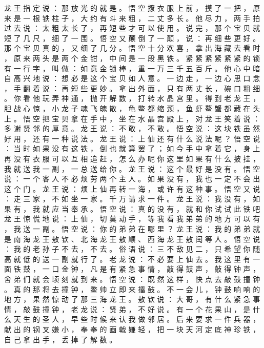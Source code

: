 {龙 王 指 定 说 ： 那 放 光 的 就 是 。
悟 空 撩 衣 服 上 前 ， 摸 了 一 把 ， 原 来 是 一 根 铁 柱 子 ， 大 约 有 斗 来 粗 ， 二 丈 多 长 。
他 尽 力 ， 两 手 拍 过 去 说 ： 太 粗 太 长 了 ， 再 短 些 才 可 以 使 用 。
说 完 ， 那 个 宝 贝 就 短 了 几 尺 ， 细 了 一 围 。
悟 空 又 颠 倒 了 一 颠 ， 说 ： 再 细 些 更 好 。
那 个 宝 贝 真 的 ， 又 细 了 几 分 。
悟 空 十 分 欢 喜 ， 拿 出 海 藏 去 看 时 ， 原 来 两 头 是 两 个 金 钳 ， 中 间 是 一 段 黑 铁 。
紧 紧 紧 紧 紧 紧 的 锁 有 一 行 字 ， 叫 做 ： 如 意 金 锁 棒 ， 重 一 万 三 千 五 百 斤 。
他 心 中 暗 自 高 兴 地 说 ： 想 必 是 这 个 宝 贝 如 人 意 。
一 边 走 ， 一 边 心 思 口 念 ， 手 翻 着 说 ： 再 短 些 更 妙 。
拿 出 外 面 ， 只 有 两 丈 长 ， 碗 口 粗 细 。
你 看 他 玩 弄 神 通 ， 抛 开 解 数 ， 打 转 水 晶 宫 里 。
得 到 老 龙 王 ， 胆 战 心 惊 ， 小 龙 子 魂 飞 魄 散 ， 龟 鳖 都 缩 颈 ， 鱼 虾 鳌 蟹 都 藏 在 头 上 。
悟 空 把 宝 贝 拿 在 手 中 ， 坐 在 水 晶 宫 殿 上 ， 对 龙 王 笑 着 说 ： 多 谢 贤 邻 的 厚 意 。
龙 王 说 ： 不 敢 ， 不 敢 。
悟 空 说 ： 这 块 铁 虽 然 好 用 ， 还 有 一 种 说 法 。
龙 王 说 ： 上 仙 还 有 什 么 说 法 呢 ？ 悟 空 说 ： 当 时 如 果 没 有 这 铁 ， 倒 也 就 算 罢 了 ； 如 今 手 中 拿 着 它 ， 身 上 再 没 有 衣 服 可 以 互 相 追 赶 ， 怎 么 办 呢 你 这 里 如 果 有 什 么 披 挂 ， 我 就 送 我 一 副 ， 一 总 送 给 你 。
龙 王 说 ： 这 个 最 好 是 没 有 。
悟 空 说 ： 一 个 客 人 不 必 烦 劳 两 个 主 人 。
如 果 没 有 ， 我 也 一 定 不 会 出 这 个 门 。
龙 王 说 ： 烦 上 仙 再 转 一 海 ， 或 许 有 这 种 事 。
悟 空 又 说 ： 走 三 家 ， 不 如 坐 一 家 。
千 万 请 求 一 件 。
龙 王 说 ： 我 没 有 ， 如 果 有 ， 我 就 应 当 奉 承 。
悟 空 说 ： 真 的 没 有 ， 就 和 你 试 试 此 铁 吧 龙 王 惊 慌 地 说 ： 上 仙 ， 切 莫 动 手 ， 等 我 看 我 弟 弟 的 地 方 可 以 有 ， 我 送 一 副 。
悟 空 说 ： 你 的 弟 弟 在 哪 里 ？ 龙 王 说 ： 我 的 弟 弟 就 是 南 海 龙 王 敖 钦 、 北 海 龙 王 敖 顺 、 西 海 龙 王 敖 闰 等 人 。
悟 空 说 ： 我 的 老 孙 子 不 去 ， 不 去 。
俗 语 说 ： 三 不 敌 见 二 ， 只 希 望 你 随 高 就 低 的 送 一 副 就 行 了 。
老 龙 说 ： 不 必 要 上 仙 去 。
我 这 里 有 一 面 铁 鼓 ， 一 口 金 钟 ， 凡 是 有 紧 急 事 情 ， 敲 得 鼓 声 ， 敲 得 钟 声 ， 舍 弟 们 就 会 顷 刻 就 到 来 。
悟 空 说 ： 既 然 这 样 ， 快 点 去 敲 鼓 撞 钟 。
真 的 那 将 去 撞 钟 ， 鳖 帅 立 即 来 擂 鼓 。
不 一 会 儿 ， 钟 鼓 响 响 的 地 方 ， 果 然 惊 动 了 那 三 海 龙 王 。
敖 钦 说 ： 大 哥 ， 有 什 么 紧 急 事 情 ， 敲 鼓 撞 钟 ， 老 龙 说 ： 贤 弟 ， 不 好 说 。
有 一 个 花 果 山 ， 是 什 么 天 生 的 圣 人 ， 早 些 时 候 来 认 我 做 邻 居 。
后 来 要 求 一 件 兵 器 ， 献 出 的 钢 叉 嫌 小 ， 奉 奉 的 画 戟 嫌 轻 ， 把 一 块 天 河 定 底 神 珍 铁 ， 自 己 拿 出 手 ， 丢 掉 了 解 数 。
}
